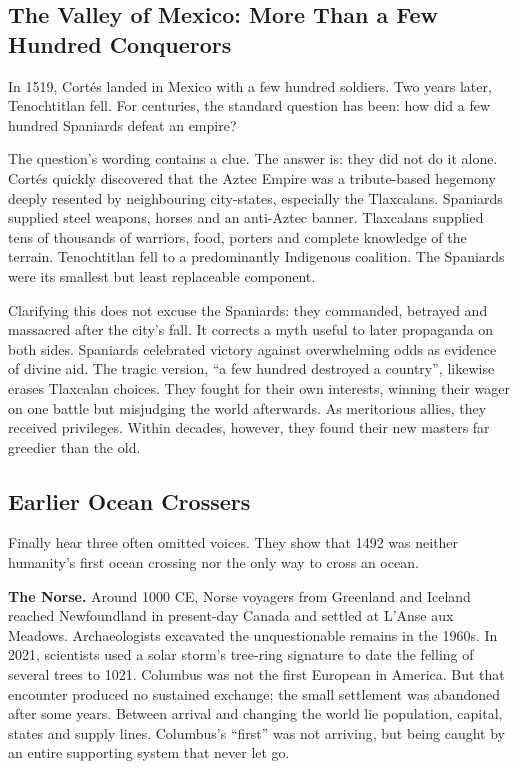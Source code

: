 \subsection[Conquest in the Valley of Mexico]{The Valley of Mexico: More Than a Few Hundred Conquerors}
In 1519, Cortés landed in Mexico with a few hundred soldiers. Two years later, Tenochtitlan fell. For centuries, the standard question has been: how did a few hundred Spaniards defeat an empire?

The question's wording contains a clue. The answer is: they did not do it alone. Cortés quickly discovered that the Aztec Empire was a tribute-based hegemony deeply resented by neighbouring city-states, especially the Tlaxcalans. Spaniards supplied steel weapons, horses and an anti-Aztec banner. Tlaxcalans supplied tens of thousands of warriors, food, porters and complete knowledge of the terrain. Tenochtitlan fell to a predominantly Indigenous coalition. The Spaniards were its smallest but least replaceable component.

Clarifying this does not excuse the Spaniards: they commanded, betrayed and massacred after the city's fall. It corrects a myth useful to later propaganda on both sides. Spaniards celebrated victory against overwhelming odds as evidence of divine aid. The tragic version, ``a few hundred destroyed a country'', likewise erases Tlaxcalan choices. They fought for their own interests, winning their wager on one battle but misjudging the world afterwards. As meritorious allies, they received privileges. Within decades, however, they found their new masters far greedier than the old.

\subsection{Earlier Ocean Crossers}
Finally hear three often omitted voices. They show that 1492 was neither humanity's first ocean crossing nor the only way to cross an ocean.

\textbf{The Norse.} Around 1000 CE, Norse voyagers from Greenland and Iceland reached Newfoundland in present-day Canada and settled at L'Anse aux Meadows. Archaeologists excavated the unquestionable remains in the 1960s. In 2021, scientists used a solar storm's tree-ring signature to date the felling of several trees to 1021. Columbus was not the first European in America. But that encounter produced no sustained exchange; the small settlement was abandoned after some years. Between arrival and changing the world lie population, capital, states and supply lines. Columbus's ``first'' was not arriving, but being caught by an entire supporting system that never let go.

